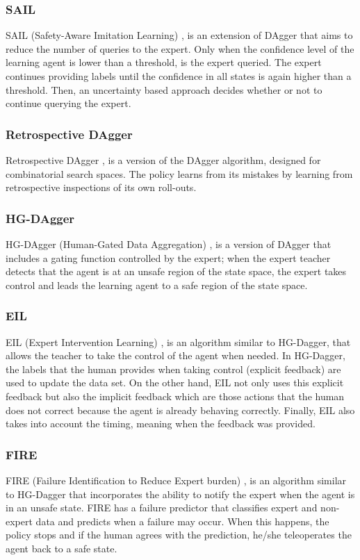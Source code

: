 \subsubsection*{SAIL}
SAIL (Safety-Aware Imitation Learning) \cite{SAIL-Xiong:2019}, is an extension of DAgger that aims to reduce the number of queries to the expert. Only when the confidence level of the learning agent is lower than a threshold, is the expert queried. The expert continues providing labels until the confidence in all states is again higher than a threshold. Then, an uncertainty based approach decides whether or not to continue querying the expert.

\subsubsection*{Retrospective DAgger}
Retrospective DAgger \cite{Retrospective-DAgger-song:2019}, is a version of the DAgger \cite{DAgger-Ross:2011} algorithm, designed for combinatorial search spaces. The policy learns from its mistakes by learning from retrospective inspections of its own roll-outs.  

\subsubsection*{HG-DAgger}
HG-DAgger (Human-Gated Data Aggregation) \cite{HG-DAgger-Kelly:2019}, is a version of DAgger \cite{DAgger-Ross:2011} that includes a gating function controlled by the expert; when the expert teacher detects that the agent is at an unsafe region of the state space, the expert takes control and leads the learning agent to a safe region of the state space.

\subsubsection*{EIL}
EIL (Expert Intervention Learning) \cite{EIL-Spencer:2020}, is an algorithm similar to HG-Dagger, that allows the teacher to take the control of the agent when needed. In HG-Dagger,  the labels that the human provides when taking control (explicit feedback) are used to update the data set. On the other hand, EIL not only uses this explicit feedback but also the implicit feedback which are those actions that the human does not correct because the agent is already behaving correctly. Finally, EIL also takes into account the timing, meaning when the feedback was provided.

\subsubsection*{FIRE}
FIRE (Failure Identification to Reduce Expert burden) \cite{FIRE-ablett:2020}, is an algorithm similar to HG-Dagger that incorporates the ability to notify the expert when the agent is in an unsafe state. FIRE has a  failure predictor that classifies expert and non-expert data and predicts when a failure may occur. When this happens, the policy stops and if the human agrees with the prediction, he/she teleoperates the agent back to a safe state.

